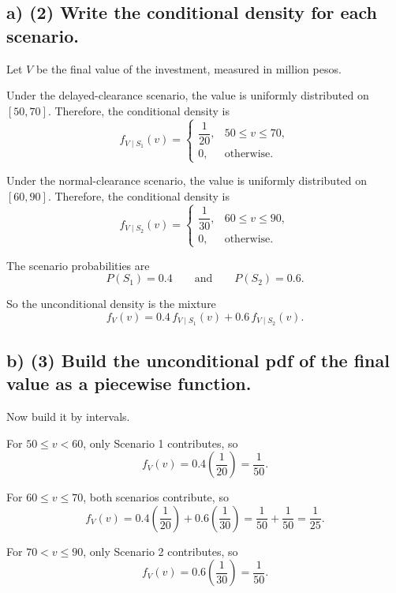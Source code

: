 \subsection*{a) \textbf{(2)} Write the conditional density for each scenario.}
\label{subsec:two-scenario-inventory-investment-c2-a}
Let $V$ be the final value of the investment, measured in million pesos.

Under the delayed-clearance scenario, the value is uniformly distributed on $[50,70]$. Therefore, the conditional density is
\[
f_{V\mid S_1}(v)=
\begin{cases}
	\dfrac{1}{20}, & 50\le v\le 70,\\[4pt]
	0, & \text{otherwise.}
\end{cases}
\]

Under the normal-clearance scenario, the value is uniformly distributed on $[60,90]$. Therefore, the conditional density is
\[
f_{V\mid S_2}(v)=
\begin{cases}
	\dfrac{1}{30}, & 60\le v\le 90,\\[4pt]
	0, & \text{otherwise.}
\end{cases}
\]

The scenario probabilities are
\[
P(S_1)=0.4
\qquad \text{and} \qquad
P(S_2)=0.6.
\]

So the unconditional density is the mixture
\[
f_V(v)=0.4\,f_{V\mid S_1}(v)+0.6\,f_{V\mid S_2}(v).
\]


\subsection*{b) \textbf{(3)} Build the unconditional pdf of the final value as a piecewise function.}
\label{subsec:two-scenario-inventory-investment-c2-b}
Now build it by intervals.

For $50\le v<60$, only Scenario 1 contributes, so
\[
f_V(v)=0.4\left(\frac{1}{20}\right)=\frac{1}{50}.
\]

For $60\le v\le 70$, both scenarios contribute, so
\[
f_V(v)=0.4\left(\frac{1}{20}\right)+0.6\left(\frac{1}{30}\right)
=\frac{1}{50}+\frac{1}{50}
=\frac{1}{25}.
\]

For $70<v\le 90$, only Scenario 2 contributes, so
\[
f_V(v)=0.6\left(\frac{1}{30}\right)=\frac{1}{50}.
\]

